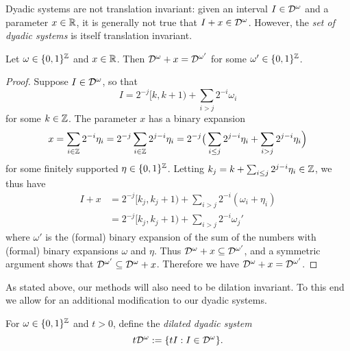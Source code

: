 Dyadic systems are not translation invariant: given an interval $I \in \mathcal{D}^{\omega}$ and a parameter $x \in \mathbb{R}$, it is generally not true that $I + x \in \mathcal{D}^{\omega}$.
However, the \emph{set of dyadic systems} is itself translation invariant.

\begin{prop}
  Let $\omega \in \{0,1\}^{\mathbb{Z}}$ and $x \in \mathbb{R}$.
  Then $\mathcal{D}^{\omega} + x = \mathcal{D}^{\omega'}$ for some $\omega' \in \{0,1\}^{\mathbb{Z}}$.
\end{prop}

\begin{proof}
  Suppose $I \in \mathcal{D}^{\omega}$, so that
  \begin{equation*}
    I = 2^{-j}[k, k+1) + \sum_{i > j} 2^{-i} \omega_{i}
  \end{equation*}
  for some $k \in \mathbb{Z}$.
  The parameter $x$ has a binary expansion
  \begin{equation*}
    x = \sum_{i \in \mathbb{Z}} 2^{-i} \eta_{i}
    = 2^{-j} \sum_{i \in \mathbb{Z}} 2^{j-i}\eta_{i}
    = 2^{-j} \big( \sum_{i \leq j} 2^{j-i}\eta_{i} + \sum_{i > j} 2^{j-i}\eta_{i} \Big) 
  \end{equation*}
  for some finitely supported $\eta \in \{0,1\}^{\mathbb{Z}}$.
  Letting $k_{j} = k + \sum_{i \leq j} 2^{j-i} \eta_{i} \in \mathbb{Z}$, we thus have
  \begin{equation*}
    \begin{aligned}
      I + x &= 2^{-j}[k_{j}, k_{j} + 1) + \sum_{i > j} 2^{-i} (\omega_{i} + \eta_{i}) \\
      &= 2^{-j}[k_{j}, k_{j} + 1) + \sum_{i > j} 2^{-i} \omega_{j}'
    \end{aligned}
  \end{equation*}
  where $\omega'$ is the (formal) binary expansion of the sum of the numbers with (formal) binary expansions $\omega$ and $\eta$.
  Thus $\mathcal{D}^{\omega} + x \subseteq \mathcal{D}^{\omega'}$, and a symmetric argument shows that $\mathcal{D}^{\omega'} \subseteq \mathcal{D}^{\omega} + x$.
  Therefore we have $\mathcal{D}^{\omega} + x = \mathcal{D}^{\omega'}$.
\end{proof}

As stated above, our methods will also need to be dilation invariant.
To this end we allow for an additional modification to our dyadic systems.

\begin{defn}
  For $\omega \in \{0,1\}^{\mathbb{Z}}$ and $t > 0$, define the \emph{dilated dyadic system}
  \begin{equation*}
    t\mathcal{D}^{\omega} := \{tI : I \in \mathcal{D}^{\omega}\}.
  \end{equation*}
\end{defn}

